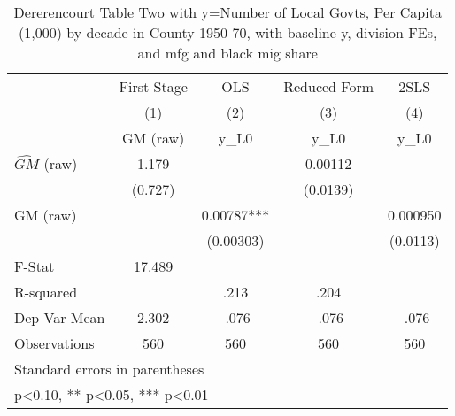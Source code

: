 \begin{table}[htbp]\centering
\def\sym#1{\ifmmode^{#1}\else\(^{#1}\)\fi}
\caption{Dererencourt Table Two with y=Number of Local Govts, Per Capita (1,000) by decade in County 1950-70, with baseline y, division FEs, and mfg and black mig share}
\begin{tabular}{l*{4}{c}}
\toprule
                    & First Stage   &         OLS   &Reduced Form   &        2SLS   \\
                    &\multicolumn{1}{c}{(1)}&\multicolumn{1}{c}{(2)}&\multicolumn{1}{c}{(3)}&\multicolumn{1}{c}{(4)}\\
                    &\multicolumn{1}{c}{GM  (raw)}&\multicolumn{1}{c}{y\_L0}&\multicolumn{1}{c}{y\_L0}&\multicolumn{1}{c}{y\_L0}\\
\midrule
$\hat{GM}$ (raw)    &       1.179   &               &     0.00112   &               \\
                    &     (0.727)   &               &    (0.0139)   &               \\
\addlinespace
GM  (raw)           &               &     0.00787***&               &    0.000950   \\
                    &               &   (0.00303)   &               &    (0.0113)   \\
\midrule
F-Stat              &      17.489   &               &               &               \\
R-squared           &               &        .213   &        .204   &               \\
Dep Var Mean        &       2.302   &       -.076   &       -.076   &       -.076   \\
Observations        &         560   &         560   &         560   &         560   \\
\bottomrule
\multicolumn{5}{l}{\footnotesize Standard errors in parentheses}\\
\multicolumn{5}{l}{\footnotesize * p<0.10, ** p<0.05, *** p<0.01}\\
\end{tabular}
\end{table}
